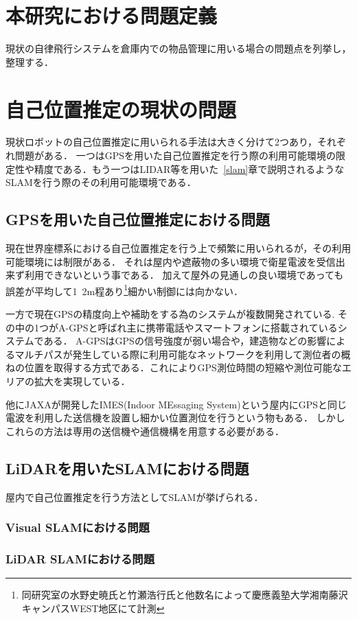 \section{本研究における問題定義}
現状の自律飛行システムを倉庫内での物品管理に用いる場合の問題点を列挙し，整理する．

\section{自己位置推定の現状の問題}
現状ロボットの自己位置推定に用いられる手法は大きく分けて2つあり，それぞれ問題がある．
一つはGPSを用いた自己位置推定を行う際の利用可能環境の限定性や精度である．もう一つはLIDAR等を用いた~\ref{slam}章で説明されるようなSLAMを行う際のその利用可能環境である．

\subsection{GPSを用いた自己位置推定における問題}
現在世界座標系における自己位置推定を行う上で頻繁に用いられるが，その利用可能環境には制限がある．
それは屋内や遮蔽物の多い環境で衛星電波を受信出来ず利用できないという事である．
加えて屋外の見通しの良い環境であっても誤差が平均して1~2m程あり\footnote{同研究室の水野史暁氏と竹瀬浩行氏と他数名によって慶應義塾大学湘南藤沢キャンパスWEST地区にて計測}細かい制御には向かない．

一方で現在GPSの精度向上や補助をする為のシステムが複数開発されている.
その中の1つがA-GPS\cite{agps}と呼ばれ主に携帯電話やスマートフォンに搭載されているシステムである．
A-GPSはGPSの信号強度が弱い場合や，建造物などの影響によるマルチパスが発生している際に利用可能なネットワークを利用して測位者の概ねの位置を取得する方式である．これによりGPS測位時間の短縮や測位可能なエリアの拡大を実現している．

他にJAXAが開発したIMES(Indoor MEssaging System)\cite{imes}という屋内にGPSと同じ電波を利用した送信機を設置し細かい位置測位を行うという物もある．
しかしこれらの方法は専用の送信機や通信機構を用意する必要がある．


\subsection{LiDARを用いたSLAMにおける問題}
屋内で自己位置推定を行う方法としてSLAMが挙げられる．

\subsubsection{Visual SLAMにおける問題}

\subsubsection{LiDAR SLAMにおける問題}


